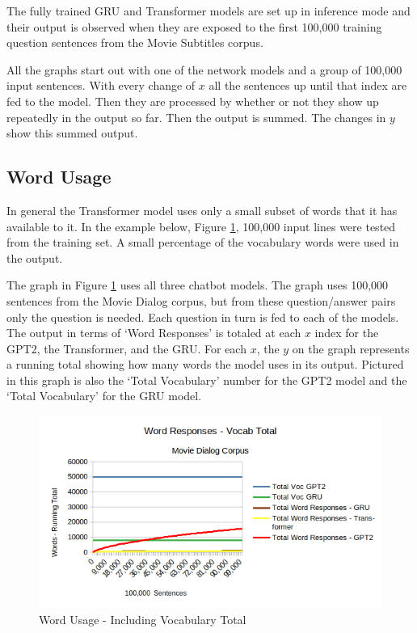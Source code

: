 The fully trained GRU and Transformer models are set up in inference mode and their output is observed when they are exposed to the first 100,000 training question sentences from the Movie Subtitles corpus.

All the graphs start out with one of the network models and a group of 100,000 input sentences. With every change of $x$ all the sentences up until that index are fed to the model. Then they are processed by whether or not they show up repeatedly in the output so far. Then the output is summed. The changes in $y$ show this summed output.

\subsection{Word Usage}

In general the Transformer model uses only a small subset of words that it has available to it. In the example below, Figure \ref{diagram-words-with-voc-total}, 100,000 input lines were tested from the training set. A small percentage of the vocabulary words were used in the output. %

The graph in Figure \ref{diagram-words-with-voc-total} uses all three chatbot models. The graph uses 100,000 sentences from the Movie Dialog corpus, but from these question/answer pairs only the question is needed. Each question in turn is fed to each of the models. The output in terms of `Word Responses' is totaled at each $x$ index for the GPT2, the Transformer, and the GRU. For each $x$, the $y$ on the graph represents a running total showing how many words the model uses in its output. Pictured in this graph is also the `Total Vocabulary' number for the GPT2 model and the `Total Vocabulary' for the GRU model.

\begin{figure}[H]
	\begin{center}
		\includegraphics[scale=0.75]{diagram-100000-vocab}
		
		
	\end{center}
	\caption[Word Usage]{Word Usage - Including Vocabulary Total}
	\label{diagram-words-with-voc-total}
	
\end{figure}

